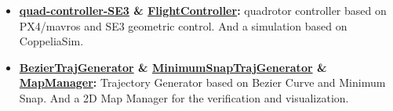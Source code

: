 \documentclass[11pt,a4paper,sans]{moderncv}        %
\begin{document}
\begin{itemize}


\item \textbf{\href{https://github.com/jianhengLiu/quad_controller_SE3}{quad-controller-SE3} \& \href{https://github.com/jianhengLiu/FlightController}{FlightController}:} quadrotor controller based on PX4/mavros and SE3 geometric control. And a simulation based on CoppeliaSim. 




\item \textbf{\href{https://github.com/jianhengLiu/BezierTrajGenerator}{BezierTrajGenerator} \& \href{https://github.com/jianhengLiu/MinimumSnapTrajGenerator}{MinimumSnapTrajGenerator} \& 
\href{https://github.com/jianhengLiu/MapManager}{MapManager}:} Trajectory Generator based on Bezier Curve and Minimum Snap. And a 2D Map Manager for the verification and visualization.



\end{itemize}


\nocite{*}

\end{document}
